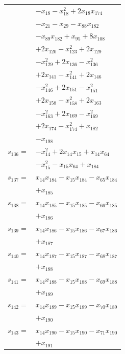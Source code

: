 \begin{longtable}{@{}r@{\;}l@{}}
 & \(\displaystyle -x_{18} -x_{18}^{2} +2x_{18}x_{174}\) \\
 & \(\displaystyle -x_{21} -x_{29} -x_{88}x_{182}\) \\
 & \(\displaystyle -x_{89}x_{182} +x_{95} +8x_{108}\) \\
 & \(\displaystyle +2x_{120} -x_{123}^{2} +2x_{129}\) \\
 & \(\displaystyle -x_{129}^{2} +2x_{136} -x_{136}^{2}\) \\
 & \(\displaystyle +2x_{141} -x_{141}^{2} +2x_{146}\) \\
 & \(\displaystyle -x_{146}^{2} +2x_{151} -x_{151}^{2}\) \\
 & \(\displaystyle +2x_{158} -x_{158}^{2} +2x_{163}\) \\
 & \(\displaystyle -x_{163}^{2} +2x_{169} -x_{169}^{2}\) \\
 & \(\displaystyle +2x_{174} -x_{174}^{2} +x_{182}\) \\
 & \(\displaystyle -x_{198}\) \\[3pt]
\(s_{136}=\) & \(\displaystyle -x_{14}^{2} +2x_{14}x_{15} +x_{14}x_{64}\) \\
 & \(\displaystyle -x_{15}^{2} -x_{15}x_{64} +x_{184}\) \\[3pt]
\(s_{137}=\) & \(\displaystyle x_{14}x_{184} -x_{15}x_{184} -x_{65}x_{184}\) \\
 & \(\displaystyle +x_{185}\) \\[3pt]
\(s_{138}=\) & \(\displaystyle x_{14}x_{185} -x_{15}x_{185} -x_{66}x_{185}\) \\
 & \(\displaystyle +x_{186}\) \\[3pt]
\(s_{139}=\) & \(\displaystyle x_{14}x_{186} -x_{15}x_{186} -x_{67}x_{186}\) \\
 & \(\displaystyle +x_{187}\) \\[3pt]
\(s_{140}=\) & \(\displaystyle x_{14}x_{187} -x_{15}x_{187} -x_{68}x_{187}\) \\
 & \(\displaystyle +x_{188}\) \\[3pt]
\(s_{141}=\) & \(\displaystyle x_{14}x_{188} -x_{15}x_{188} -x_{69}x_{188}\) \\
 & \(\displaystyle +x_{189}\) \\[3pt]
\(s_{142}=\) & \(\displaystyle x_{14}x_{189} -x_{15}x_{189} -x_{70}x_{189}\) \\
 & \(\displaystyle +x_{190}\) \\[3pt]
\(s_{143}=\) & \(\displaystyle x_{14}x_{190} -x_{15}x_{190} -x_{71}x_{190}\) \\
 & \(\displaystyle +x_{191}\) \\[3pt]

\end{longtable}
